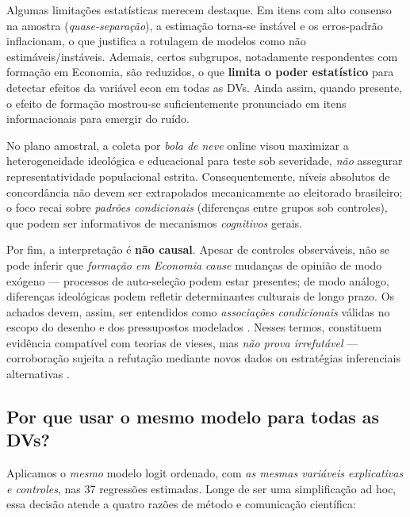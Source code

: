 Algumas limitações estatísticas merecem destaque. Em itens com alto consenso na amostra (\textit{quase-separação}), a estimação torna-se instável e os erros-padrão inflacionam, o que justifica a rotulagem de modelos como não estimáveis/instáveis. Ademais, certos subgrupos, notadamente respondentes com formação em Economia, são reduzidos, o que \textbf{limita o poder estatístico} para detectar efeitos da variável \(\mathrm{econ}\) em todas as DVs. Ainda assim, quando presente, o efeito de formação mostrou-se suficientemente pronunciado em itens informacionais para emergir do ruído.

No plano amostral, a coleta por \textit{bola de neve} online visou maximizar a heterogeneidade ideológica e educacional para teste sob severidade, \textit{não} assegurar representatividade populacional estrita. Consequentemente, níveis absolutos de concordância não devem ser extrapolados mecanicamente ao eleitorado brasileiro; o foco recai sobre \textit{padrões condicionais} (diferenças entre grupos sob controles), que podem ser informativos de mecanismos \textit{cognitivos} gerais. 

Por fim, a interpretação é \textbf{não causal}. Apesar de controles observáveis, não se pode inferir que \textit{formação em Economia} \textit{cause} mudanças de opinião de modo exógeno — processos de auto-seleção podem estar presentes; de modo análogo, diferenças ideológicas podem refletir determinantes culturais de longo prazo. Os achados devem, assim, ser entendidos como \textit{associações condicionais} válidas no escopo do desenho e dos pressupostos modelados \cite{hausman2008}. Nesses termos, constituem evidência compatível com teorias de vieses, mas \textit{não prova irrefutável} — corroboração sujeita a refutação mediante novos dados ou estratégias inferenciais alternativas \cite{popperlogic}.

\subsection{Por que usar o mesmo modelo para todas as DVs?}\label{sec:modelo-unico}
Aplicamos o \emph{mesmo} modelo logit ordenado, com \emph{as mesmas variáveis explicativas e controles}, nas 37 regressões estimadas. Longe de ser uma simplificação ad hoc, essa decisão atende a quatro razões de método e comunicação científica:

